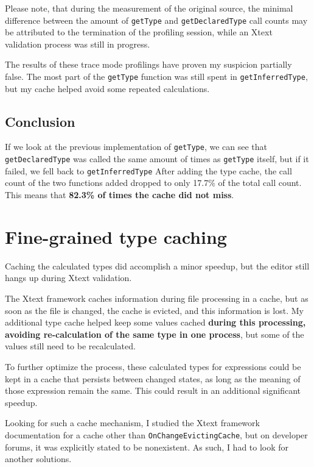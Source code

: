 \documentclass[11pt,a4paper,oneside]{report}
\begin{document}
Please note, that during the measurement of the original source, the minimal
difference between the amount of \texttt{getType} and \texttt{getDeclaredType}
call counts may be attributed to the termination of the profiling session, while
an Xtext validation process was still in progress.

The results of these trace mode profilings have proven my suspicion partially
false. The most part of the \texttt{getType} function was still spent in
\texttt{getInferredType}, but my cache helped avoid some repeated calculations.

\pagebreak
\subsection{Conclusion}
If we look at the previous implementation of \texttt{getType}, we can see that
\texttt{getDeclaredType} was called the same amount of times as
\texttt{getType} itself, but if it failed, we fell back to
\texttt{getInferredType} After adding the type cache, the call count of the two
functions added dropped to only 17.7\% of the total call count. This means that
\textbf{82.3\% of times the cache did not miss}.

\section{Fine-grained type caching}
Caching the calculated types did accomplish a minor speedup, but the editor
still hangs up during Xtext validation.

The Xtext framework caches information during file processing in a cache, but as
soon as the file is changed, the cache is evicted, and this information is lost.
My additional type cache helped keep some values cached \textbf{during this
processing, avoiding re-calculation of the same type in one process}, but some
of the values still need to be recalculated.

To further optimize the process, these calculated types for expressions could
be kept in a cache that persists between changed states, as long as the meaning
of those expression remain the same. This could result in an additional
significant speedup.

Looking for such a cache mechanism, I studied the Xtext framework documentation
for a cache other than \texttt{OnChangeEvictingCache}, but on developer forums,
it was explicitly stated to be nonexistent\cite{xtext-fine-grained-caching}. As
such, I had to look for another solutions.
\end{document}
